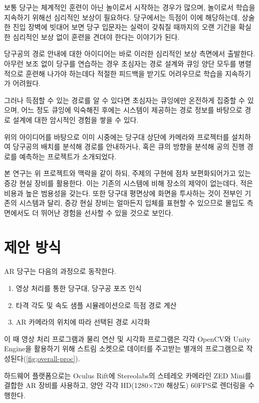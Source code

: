 \documentclass[10pt]{oblivoir}
\begin{document}
보통 당구는 체계적인 훈련이 아닌 놀이로서 시작하는 경우가 많으며, 놀이로서 학습을 지속하기 위해선 심리적인 보상이 필요하다. 당구에서는 득점이 이에 해당하는데, 상술한 진입 장벽에 빗대어 보면 당구 입문자는 실력이 갖춰질 때까지의 오랜 기간을 확실한 심리적인 보상 없이 훈련을 견뎌야 한다는 이야기가 된다.


당구공의 경로 안내에 대한 아이디어는 바로 이러한 심리적인 보상 측면에서 출발한다. 아무런 보조 없이 당구를 연습하는 경우 초심자는 경로 설계와 큐잉 양단 모두를 병렬적으로 훈련해 나가야 하는데다 적절한 피드백을 받기도 어려우므로 학습을 지속하기가 어려웠다. 

그러나 득점할 수 있는 경로를 알 수 있다면 초심자는 큐잉에만 온전하게 집중할 수 있으며, 어느 정도 큐잉에 익숙해진 후에는 시스템이 제공하는 경로 정보를 바탕으로 경로 설계에 대한 암시적인 경험을 쌓을 수 있다.

위의 아이디어를 바탕으로 이미 시중에는 당구대 상단에 카메라와 프로젝터를 설치하여 당구공의 배치를 분석해 경로를 안내하거나, 혹은 큐의 방향을 분석해 공의 진행 경로를 예측하는 프로젝트가 소개되었다.
\cite{AR-Pool-Projector} \cite{AR-Pool-Projector-2}

본 연구는 위 프로젝트와 맥락을 같이 하되, 주제의 구현에 점차 보편화되어가고 있는 증강 현실 장비를 활용한다. 이는 기존의 시스템에 비해 장소의 제약이 없는데다, 적은 비용과 높은 범용성을 갖는다. 또한 당구대 평면상에 화면을 투사하는 것이 전부인 기존의 시스템과 달리, 증강 현실 장비는 얼마든지 입체를 표현할 수 있으므로 몰입도 측면에서도 더 뛰어난 경험을 선사할 수 있을 것으로 보인다.

\section{제안 방식}
AR 당구는 다음의 과정으로 동작한다.
\begin{enumerate}
    \item 영상 처리를 통한 당구대, 당구공 포즈 인식
    \item 타격 각도 및 속도 샘플 시뮬레이션으로 득점 경로 계산
    \item AR 카메라의 위치에 따라 선택된 경로 시각화
\end{enumerate}

이 때 영상 처리 프로그램과 물리 연산 및 시각화 프로그램은 각각 OpenCV와 Unity Engine을 활용하기 위해 스트림 소켓으로 데이터를 주고받는 별개의 프로그램으로 작성된다(\cref{fig;overall-proc}). 

하드웨어 플랫폼으로는 Oculus Rift에 Stereolabs의 스테레오 카메라인 ZED Mini를 결합한 AR 장비를 사용하고, 양안 각각 HD(1280$\times$720 해상도) 60FPS로 렌더링을 수행한다.
\end{document}
